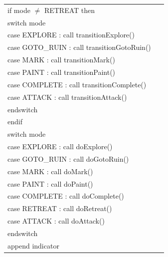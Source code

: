 \documentclass{article}
\newenvironment{pseudobox}
{
\centering
\begin{longtable}{|p{0.94\linewidth}|}
\hline
}
{
\\ \hline
\end{longtable}
\vspace{0.05cm}
}
\begin{document}
\begin{pseudobox}
\hspace*{1em} if mode $\neq$ RETREAT then \\
\hspace*{2em} switch mode \\
\hspace*{3em} case EXPLORE   : call transitionExplore() \\
\hspace*{3em} case GOTO\_RUIN : call transitionGotoRuin() \\
\hspace*{3em} case MARK      : call transitionMark() \\
\hspace*{3em} case PAINT     : call transitionPaint() \\
\hspace*{3em} case COMPLETE  : call transitionComplete() \\
\hspace*{3em} case ATTACK    : call transitionAttack() \\
\hspace*{2em} endswitch \\
\hspace*{1em} endif \\

\hspace*{1em} switch mode \\
\hspace*{2em} case EXPLORE   : call doExplore() \\
\hspace*{2em} case GOTO\_RUIN : call doGotoRuin() \\
\hspace*{2em} case MARK      : call doMark() \\
\hspace*{2em} case PAINT     : call doPaint() \\
\hspace*{2em} case COMPLETE  : call doComplete() \\
\hspace*{2em} case RETREAT   : call doRetreat() \\
\hspace*{2em} case ATTACK    : call doAttack() \\
\hspace*{1em} endswitch \\

\hspace*{1em} append indicator
\end{pseudobox}
\end{document}
